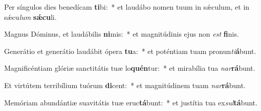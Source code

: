 \item Per síngulos dies benedícam \textbf{ti}bi:~* et laudábo nomen tuum in sǽculum, et in sǽcu\textit{lum} \textbf{sǽ}\textbf{cu}li.
\item Magnus Dóminus, et laudábilis \textbf{ni}mis:~* et magnitúdinis ejus non \textit{est} \textbf{fi}nis.
\item Generátio et generátio laudábit ópera \textbf{tu}a:~* et poténtiam tuam pronun\textit{ti}\textbf{á}bunt.
\item Magnificéntiam glóriæ sanctitátis tuæ lo\textbf{quén}tur:~* et mirabília tua \textit{nar}\textbf{rá}bunt.
\item Et virtútem terribílium tuórum \textbf{di}cent:~* et magnitúdinem tuam \textit{nar}\textbf{rá}bunt.
\item Memóriam abundántiæ suavitátis tuæ eruc\textbf{tá}bunt:~* et justítia tua ex\textit{sul}\textbf{tá}bunt.
